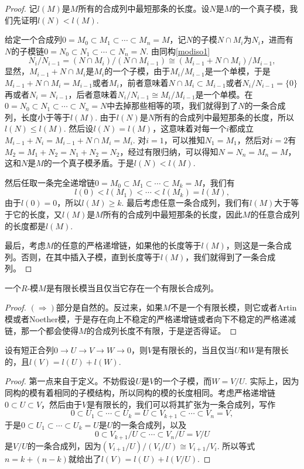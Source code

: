 \begin{proof}
	记$l(M)$是$M$所有的合成列中最短那条的长度。设$N$是$M$的一个真子模，我们先证明$l(N)<l(M)$.

	给定一个合成列$0=M_0\subset M_1\subset \cdots\subset M_n=M$，记$N$的子模$N\cap M_i$为$N_i$，进而有$N$的子模链$0=N_0\subset N_1\subset \cdots\subset N_n=N$. 由同构\eqref{modiso1}
	\[
	N_i/N_{i-1}=(N\cap M_i)/(N\cap M_{i-1})\cong (M_{i-1}+N\cap M_i)/M_{i-1},
	\]
	显然，$M_{i-1}+N\cap M_i$是$M_i$的一个子模，由于$M_i/M_{i-1}$是一个单模，于是$M_{i-1}+N\cap M_i=M_{i-1}$或者$M_i$，前者意味着$N\cap M_i\subset M_{i-1}$或者$N_i/N_{i-1}=\{0\}$再或者$N_i=N_{i-1}$，后者意味着$N_i/N_{i-1}\cong M_i/M_{i-1}$是一个单模。在$0=N_0\subset N_1\subset \cdots\subset N_n=N$中去掉那些相等的项，我们就得到了$N$的一条合成列，长度小于等于$l(M)$. 由于$l(N)$是$N$所有的合成列中最短那条的长度，所以$l(N)\leq l(M)$. 然后设$l(N)=l(M)$，这意味着对每一个$i$都成立$M_{i-1}+N_i=M_{i-1}+N\cap M_i=M_i$. 对$i=1$，可以推知$N_1=M_1$，然后对$i=2$有$M_2=M_1+N_2=N_1+N_2=N_2$，经过有限归纳，可以得知$N=N_n=M_n=M$，这和$N$是$M$的一个真子模矛盾。于是$l(N)<l(M)$.

	然后任取一条完全递增链$0=M_0\subset M_1\subset \cdots\subset M_k=M$，我们有
	\[
	l(0)<l(M_1)<\cdots<l(M_k)=l(M),
	\]
	由于$l(0)=0$，所以$l(M)\geq k$. 最后考虑任意一条合成列，我们有$l(M)$大于等于它的长度，又$l(M)$是$M$所有的合成列中最短那条的长度，因此$M$的任意合成列的长度都是$l(M)$.

	最后，考虑$M$的任意的严格递增链，如果他的长度等于$l(M)$，则这是一条合成列。否则，在其中插入子模，直到长度等于$l(M)$，我们就得到了一条合成列。
\end{proof}

\begin{pro}
一个$R$-模$M$是有限长模当且仅当它存在一个有限长合成列。
\end{pro}

\begin{proof}
	$(\Rightarrow)$部分是自然的。反过来，如果$M$不是一个有限长模，则它或者Artin模或者Noether模，于是存在向上不稳定的严格递增链或者向下不稳定的严格递减链，那一个都会使得$M$的合成列长度不有限，于是逆否得证。
\end{proof}

\begin{pro}
设有短正合列$0\to U\to V\to W\to 0$，则$V$是有限长的，当且仅当$U$和$W$是有限长的，且$l(V)=l(U)+l(W)$.
\end{pro}

\begin{proof}
	第一点来自于定义。不妨假设$U$是$V$的一个子模，而$W=V/U$. 实际上，因为同构的模有着相同的子模结构，所以同构的模的长度相同。考虑严格递增链$0\subset U\subset V$，然后由于$V$是有限长的，我们可以将其扩张为一条合成列，写作
	\[
	0\subset U_1\subset \cdots \subset U_k=U\subset V_{k+1}\subset \cdots \subset V_n=V,
	\]
	于是$0\subset U_1\subset \cdots \subset U_k=U$是$U$的一条合成列，以及
	\[
	0\subset V_{k+1}/U\subset \cdots \subset V_n/U=V/U
	\]
	是$V/U$的一条合成列，因为$(V_{i+1}/U)/(V_{i}/U)\cong V_{i+1}/V_i$. 所以等式$n=k+(n-k)$就给出了$l(V)=l(U)+l(V/U)$.
\end{proof}

